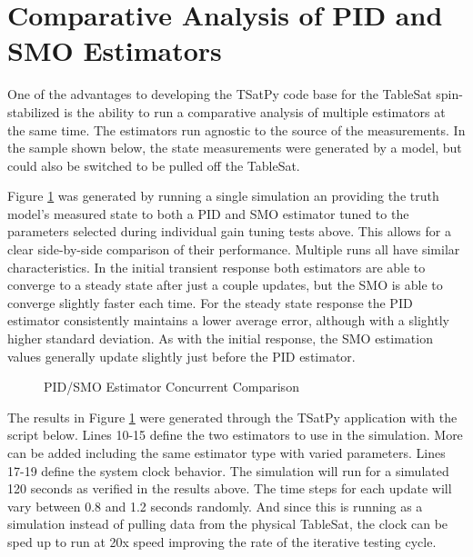 \section{Comparative Analysis of PID and SMO Estimators}
\label{sec:ComparativeAnalysysofPIDandSMOEstimators}

One of the advantages to developing the TSatPy code base for the TableSat spin-stabilized is the ability to run a comparative analysis of multiple estimators at the same time.  The estimators run agnostic to the source of the measurements.  In the sample shown below, the state measurements were generated by a model, but could also be switched to be pulled off the TableSat.

Figure \ref{fig:PIDSMOEstimatorConcurrentComparison} was generated by running a single simulation an providing the truth model's measured state to both a PID and SMO estimator tuned to the parameters selected during individual gain tuning tests above.  This allows for a clear side-by-side comparison of their performance.  Multiple runs all have similar characteristics.  In the initial transient response both estimators are able to converge to a steady state after just a couple updates, but the SMO is able to converge slightly faster each time.  For the steady state response the PID estimator consistently maintains a lower average error, although with a slightly higher standard deviation.  As with the initial response, the SMO estimation values generally update slightly just before the PID estimator.

\begin{figure}[H]
  \centerline{}
  \caption{PID/SMO Estimator Concurrent Comparison}
  \label{fig:PIDSMOEstimatorConcurrentComparison}
\end{figure}

The results in Figure \ref{fig:PIDSMOEstimatorConcurrentComparison} were generated through the TSatPy application with the script below.  Lines 10-15 define the two estimators to use in the simulation.  More can be added including the same estimator type with varied parameters.  Lines 17-19 define the system clock behavior.  The simulation will run for a simulated 120 seconds as verified in the results above.  The time steps for each update will vary between 0.8 and 1.2 seconds randomly.  And since this is running as a simulation instead of pulling data from the physical TableSat, the clock can be sped up to run at 20x speed improving the rate of the iterative testing cycle.

